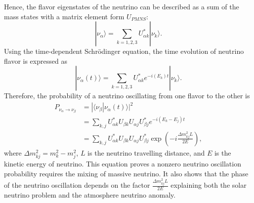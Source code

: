     Hence, the flavor eigenstates of the neutrino can be described as a sum of the mass states with a matrix element form $U_{PMNS}$:
    \begin{equation}\label{eq17}
    |\nu_\alpha\rangle = \sum\limits_{k=1,2,3} U^*_{\alpha k}|\nu_k\rangle.
    \end{equation}
    Using the time-dependent Schr{\"o}dinger equation, the time evolution of neutrino flavor is expressed as
    \begin{equation}
    \label{eq18}
    |\nu_\alpha(t)\rangle = \sum\limits_{k=1,2,3} U^*_{\alpha k}e^{-i(E_k)t}|\nu_k\rangle.
    \end{equation}
    Therefore, the probability of a neutrino oscillating from one flavor to the other is
    \begin{equation}\label{eq19}
    \begin{aligned}
    P_{\nu_\alpha\rightarrow\nu_\beta} & =|\langle\nu_\beta|\nu_\alpha(t)\rangle|^2 \\
    & =\sum\limits_{k,j}U^*_{\alpha k} U_{\beta k} U_{\alpha j} U^*_{\beta j} e^{-i(E_k-E_j)t} \\
    & =\sum\limits_{k,j}U^*_{\alpha k} U_{\beta k} U_{\alpha j} U^*_{\beta j}\exp\left(-i\frac{\Delta m^2_{kj}L}{2E}\right),
    \end{aligned}
    \end{equation}
    where $\Delta m_{kj}^2 =m_k^2 - m_j^2$, $L$ is the neutrino travelling distance, and $E$ is the kinetic energy of neutrino.
    This equation proves a nonzero neutrino oscillation probability requires the mixing of massive neutrino.
    It also shows that the phase of the neutrino oscillation depends on the factor $\frac{\Delta m^2_{kj}L}{2E}$ explaining both the solar neutrino problem and the atmosphere neutrino anomaly. 
    
